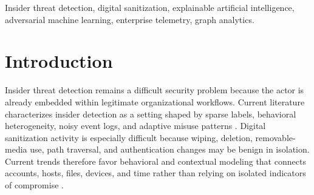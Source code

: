 \documentclass[journal]{IEEEtran}
\begin{document}
\begin{abstract}
Enterprise environments generate authentication telemetry at a scale where malicious activity is rare, temporally clustered, and difficult to separate from legitimate use. This paper evaluates an explainable ensemble pipeline using LANL authentication events labeled from the accompanying red-team ground truth, group-aware validation, cross-validation, adversarial stress tests, ablation, and complexity measurements. At a threshold of 0.99237144 selected on a validation set and applied unchanged to the held-out test set, the meta-classifier obtained PR-AUC, macro-F1, and malicious recall of 1.0 with 0 false positives per 1000 events. These values are not evidence of generalizable behavioral detection: XGBoost assigned all feature importance to \texttt{hour\_cos}, its mean absolute SHAP value was 8.187043 while every other feature was 0, removal of the temporal feature group reduced PR-AUC to 0.208214, and the distribution-shift test reduced PR-AUC to 0.032199. The principal finding is therefore that conventional held-out evaluation can substantially overstate security-model capability when malicious and benign observations are separated by a temporal sampling artifact.
\end{abstract}

\begin{IEEEkeywords}
Insider threat detection, digital sanitization, explainable artificial intelligence, adversarial machine learning, enterprise telemetry, graph analytics.
\end{IEEEkeywords}






%
\IEEEpeerreviewmaketitle



\section{Introduction}
Insider threat detection remains a difficult security problem because the actor is already embedded within legitimate organizational workflows. Current literature characterizes insider detection as a setting shaped by sparse labels, behavioral heterogeneity, noisy event logs, and adaptive misuse patterns \cite{sarker2023insider,al2023review,liu2024graph}. Digital sanitization activity is especially difficult because wiping, deletion, removable-media use, path traversal, and authentication changes may be benign in isolation. Current trends therefore favor behavioral and contextual modeling that connects accounts, hosts, files, devices, and time rather than relying on isolated indicators of compromise \cite{al2023review,liu2024graph}.
\end{document}
